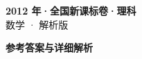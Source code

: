 \documentclass[zihao=-4, a4paper]{ctexart}
\begin{document}
\begin{center}
  {\Large\bfseries 2012 年·全国新课标卷·理科}\\[4pt]
  {\large 数学 · 解析版}
\end{center}
\medskip
{}

\clearpage
{}
\begin{center}{\Large\bfseries 参考答案与详细解析}\end{center}
\medskip

\end{document}
